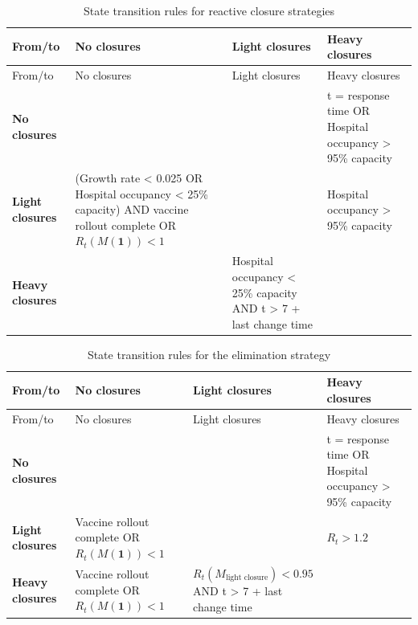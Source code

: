 \documentclass[
]{article}
\begin{document}
\begin{longtable}[]{@{}
  >{\raggedright\arraybackslash}p{}
  >{\raggedright\arraybackslash}p{}
  >{\raggedright\arraybackslash}p{}
  >{\raggedright\arraybackslash}p{}@{}}
\caption{\label{tab:rulesreactive} State transition rules for reactive closure strategies}\tabularnewline
\toprule
From/to & No closures & Light closures & Heavy closures \\
\midrule
\endfirsthead
\toprule
From/to & No closures & Light closures & Heavy closures \\
\midrule
\endhead
\textbf{No closures} & & & t = response time OR Hospital occupancy \textgreater{} 95\% capacity \\
\textbf{Light closures} & (Growth rate \textless{} 0.025 OR Hospital occupancy \textless{} 25\% capacity) AND vaccine rollout complete OR \(R_t(M(\textbf{1})) < 1\) & & Hospital occupancy \textgreater{} 95\% capacity \\
\textbf{Heavy closures} & & Hospital occupancy \textless{} 25\% capacity AND t \textgreater{} 7 + last change time & \\
\bottomrule
\end{longtable}

\begin{longtable}[]{@{}
  >{\raggedright\arraybackslash}p{}
  >{\raggedright\arraybackslash}p{}
  >{\raggedright\arraybackslash}p{}
  >{\raggedright\arraybackslash}p{}@{}}
\caption{\label{tab:ruleselimination} State transition rules for the elimination strategy}\tabularnewline
\toprule
From/to & No closures & Light closures & Heavy closures \\
\midrule
\endfirsthead
\toprule
From/to & No closures & Light closures & Heavy closures \\
\midrule
\endhead
\textbf{No closures} & & & t = response time OR Hospital occupancy \textgreater{} 95\% capacity \\
\textbf{Light closures} & Vaccine rollout complete OR \(R_t(M(\textbf{1})) < 1\) & & \(R_t > 1.2\) \\
\textbf{Heavy closures} & Vaccine rollout complete OR \(R_t(M(\textbf{1})) < 1\) & \(R_t(M_{\text{light closure}}) < 0.95\) AND t \textgreater{} 7 + last change time & \\
\bottomrule
\end{longtable}
\end{document}
